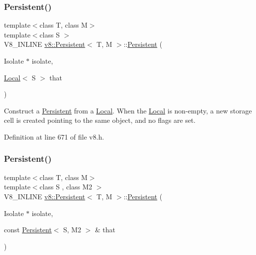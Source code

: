 \subsubsection{\texorpdfstring{Persistent()}{Persistent()}\hspace{0.1cm}{\footnotesize\ttfamily [2/4]}}
{\footnotesize\ttfamily template$<$class T, class M$>$ \\
template$<$class S $>$ \\
V8\+\_\+\+I\+N\+L\+I\+NE \mbox{\hyperlink{classv8_1_1Persistent}{v8\+::\+Persistent}}$<$ T, M $>$\+::\mbox{\hyperlink{classv8_1_1Persistent}{Persistent}} (\begin{DoxyParamCaption}\item[{Isolate $\ast$}]{isolate,  }\item[{\mbox{\hyperlink{classv8_1_1Local}{Local}}$<$ S $>$}]{that }\end{DoxyParamCaption})\hspace{0.3cm}{\ttfamily [inline]}}

Construct a \mbox{\hyperlink{classv8_1_1Persistent}{Persistent}} from a \mbox{\hyperlink{classv8_1_1Local}{Local}}. When the \mbox{\hyperlink{classv8_1_1Local}{Local}} is non-\/empty, a new storage cell is created pointing to the same object, and no flags are set. 

Definition at line 671 of file v8.\+h.

\mbox{\label{classv8_1_1Persistent_aaf9eb7c4e6d0ef2c81a2c08238653578}} 
\subsubsection{\texorpdfstring{Persistent()}{Persistent()}\hspace{0.1cm}{\footnotesize\ttfamily [3/4]}}
{\footnotesize\ttfamily template$<$class T, class M$>$ \\
template$<$class S , class M2 $>$ \\
V8\+\_\+\+I\+N\+L\+I\+NE \mbox{\hyperlink{classv8_1_1Persistent}{v8\+::\+Persistent}}$<$ T, M $>$\+::\mbox{\hyperlink{classv8_1_1Persistent}{Persistent}} (\begin{DoxyParamCaption}\item[{Isolate $\ast$}]{isolate,  }\item[{const \mbox{\hyperlink{classv8_1_1Persistent}{Persistent}}$<$ S, M2 $>$ \&}]{that }\end{DoxyParamCaption})\hspace{0.3cm}{\ttfamily [inline]}}

